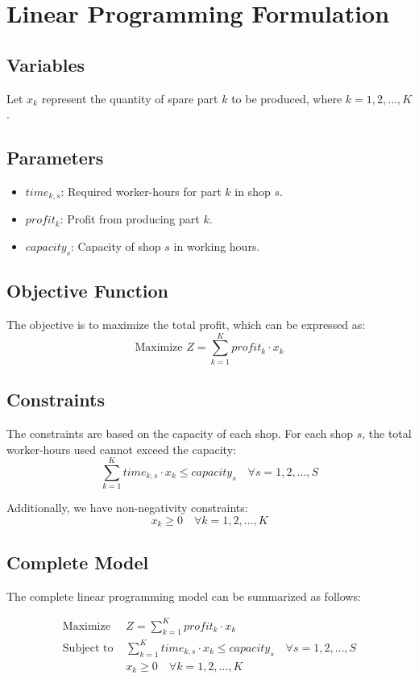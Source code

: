 \documentclass{article}
\begin{document}
\section*{Linear Programming Formulation}

\subsection*{Variables}
Let \( x_k \) represent the quantity of spare part \( k \) to be produced, where \( k = 1, 2, \ldots, K \).

\subsection*{Parameters}
\begin{itemize}
    \item \( time_{k,s} \): Required worker-hours for part \( k \) in shop \( s \).
    \item \( profit_k \): Profit from producing part \( k \).
    \item \( capacity_s \): Capacity of shop \( s \) in working hours.
\end{itemize}

\subsection*{Objective Function}
The objective is to maximize the total profit, which can be expressed as:
\[
\text{Maximize } Z = \sum_{k=1}^{K} profit_k \cdot x_k
\]

\subsection*{Constraints}
The constraints are based on the capacity of each shop. For each shop \( s \), the total worker-hours used cannot exceed the capacity:
\[
\sum_{k=1}^{K} time_{k,s} \cdot x_k \leq capacity_s \quad \forall s = 1, 2, \ldots, S
\]

Additionally, we have non-negativity constraints:
\[
x_k \geq 0 \quad \forall k = 1, 2, \ldots, K
\]

\subsection*{Complete Model}
The complete linear programming model can be summarized as follows:

\begin{align*}
\text{Maximize } & Z = \sum_{k=1}^{K} profit_k \cdot x_k \\
\text{Subject to } & \sum_{k=1}^{K} time_{k,s} \cdot x_k \leq capacity_s \quad \forall s = 1, 2, \ldots, S \\
& x_k \geq 0 \quad \forall k = 1, 2, \ldots, K
\end{align*}
\end{document}
